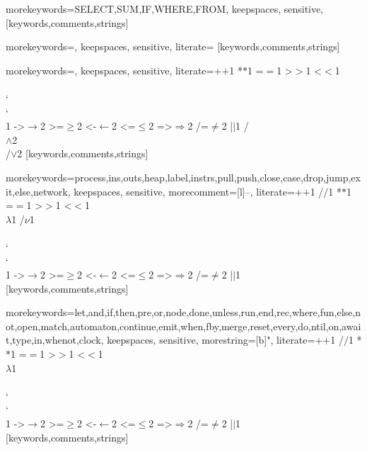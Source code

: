%
  {morekeywords={SELECT,SUM,IF,WHERE,FROM},%
   keepspaces,%
   sensitive,%
  }[keywords,comments,strings]%

%
  {morekeywords={},%
   keepspaces,%
   sensitive,%
   literate=%
  }[keywords,comments,strings]%

%
  {morekeywords={},%
   keepspaces,%
   sensitive,%
   literate={+}{{$+$}}1 {*}{{$*$}}1 {=}{{$=$}}1
            {>}{{$>$}}1 {<}{{$<$}}1
            {\\\\}{{\char`\\\char`\\}}1
            {->}{{$\rightarrow$}}2 {>=}{{$\geq$}}2 {<-}{{$\leftarrow$}}2
            {<=}{{$\leq$}}2 {=>}{{$\Rightarrow$}}2 
            {/=}{{$\ne$}}2
            {|}{{$\mid$}}1
            {/\\}{{$\wedge$}}2
            {\\/}{{$\vee$}}2
  }[keywords,comments,strings]%

%
  {morekeywords={process,ins,outs,heap,label,instrs,pull,push,close,case,drop,jump,exit,else,network},%
   keepspaces,%
   sensitive,%
   morecomment=[l]--,%
   literate={+}{{$+$}}1 {/}{{$/$}}1 {*}{{$*$}}1 {=}{{$=$}}1
            {>}{{$>$}}1 {<}{{$<$}}1 {\\}{{$\lambda$}}1 {/}{{$\nu$}}1
            {\\\\}{{\char`\\\char`\\}}1
            {->}{{$\rightarrow$}}2 {>=}{{$\geq$}}2 {<-}{{$\leftarrow$}}2
            {<=}{{$\leq$}}2 {=>}{{$\Rightarrow$}}2 
            {/=}{{$\ne$}}2
            {|}{{$\mid$}}1
  }[keywords,comments,strings]%

%
  {morekeywords={let,and,if,then,pre,or,node,done,unless,run,end,rec,where,fun,else,not,open,match,automaton,continue,emit,when,fby,merge,reset,every,do,ntil,on,await,type,in,whenot,clock},%
   keepspaces,%
   sensitive,%
   morestring=[b]",%
   literate={+}{{$+$}}1 {/}{{$/$}}1 {*}{{$*$}}1 {=}{{$=$}}1
            {>}{{$>$}}1 {<}{{$<$}}1 {\\}{{$\lambda$}}1
            {\\\\}{{\char`\\\char`\\}}1
            {->}{{$\rightarrow$}}2 {>=}{{$\geq$}}2 {<-}{{$\leftarrow$}}2
            {<=}{{$\leq$}}2 {=>}{{$\Rightarrow$}}2 
            {/=}{{$\ne$}}2
            {|}{{$\mid$}}1
  }[keywords,comments,strings]%

